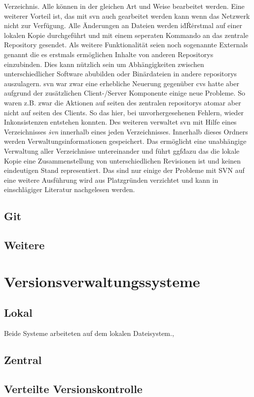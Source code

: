 Verzeichnis. Alle können in der gleichen Art und Weise bearbeitet werden. Eine
weiterer Vorteil ist, das mit \acrlong{svn} auch gearbeitet werden kann wenn
das Netzwerk nicht zur Verfügung. Alle Änderungen an Dateien werden i\.d\.R\.
erstmal auf einer lokalen Kopie durchgeführt und mit einem seperaten Kommando
an das zentrale Repository gesendet. Als weitere Funktionalität seien noch
sogenannte Externals genannt die es erstmals ermöglichen Inhalte von anderen
Repositorys einzubinden. Dies kann nützlich sein um Abhängigkeiten zwischen
unterschiedlicher Software abubilden oder Binärdateien in andere
\glspl{repository} auszulagern. \acrlong{svn} war zwar eine erhebliche Neuerung
gegenüber \acrlong{cvs} hatte aber aufgrund der zusätzlichen Client-/Server
Komponente einige neue Probleme. So waren z.B. zwar die Aktionen auf seiten des
zentralen \glspl{repository} atomar aber nicht auf seiten des Clients. So das
hier, bei unvorhergesehenen Fehlern, wieder Inkonsistenzen entstehen konnten.
Des weiteren verwaltet \acrshort{svn} mit Hilfe eines Verzeichnisses \textit{\.svn}
innerhalb eines jeden Verzeichnisses. Innerhalb dieses Ordners werden
Verwaltungsinformationen gespeichert. Das ermöglicht eine unabhängige
Verwaltung aller Verzeichnisse untereinander und führt ggf\. dazu das die lokale
Kopie eine Zusammenstellung von unterschiedlichen Revisionen ist und keinen
eindeutigen Stand representiert. Das sind nur einige der Probleme mit SVN auf
eine weitere Ausführung wird aus Platzgründen verzichtet und kann in
einschlägiger Literatur nachgelesen werden.\cite[s.~383-385]{cd} 
\subsection{Git}
\subsection{Weitere}
\section{Versionsverwaltungssysteme}
\subsection{Lokal}
Beide Systeme arbeiteten auf dem lokalen
Dateisystem.,
\subsection{Zentral}
\subsection{Verteilte Versionskontrolle}
